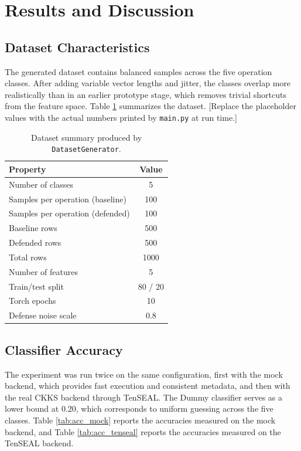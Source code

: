 \documentclass[12pt,a4paper]{article}
\begin{document}
\section{Results and Discussion}

\subsection{Dataset Characteristics}
The generated dataset contains balanced samples across the five operation classes. After adding variable vector lengths and jitter, the classes overlap more realistically than in an earlier prototype stage, which removes trivial shortcuts from the feature space. Table \ref{tab:dataset} summarizes the dataset. [Replace the placeholder values with the actual numbers printed by \texttt{main.py} at run time.]

\begin{table}[h]
\centering
\caption{Dataset summary produced by \texttt{DatasetGenerator}.}
\label{tab:dataset}
\begin{tabular}{lc}
\toprule
\textbf{Property} & \textbf{Value} \\
\midrule
Number of classes                 & 5 \\
Samples per operation (baseline)  & 100 \\
Samples per operation (defended)  & 100 \\
Baseline rows                     & 500 \\
Defended rows                     & 500 \\
Total rows                        & 1000 \\
Number of features                & 5 \\
Train/test split                  & 80 / 20 \\
Torch epochs                      & 10 \\
Defense noise scale               & 0.8 \\
\bottomrule
\end{tabular}
\end{table}

\subsection{Classifier Accuracy}
The experiment was run twice on the same configuration, first with the mock backend, which provides fast execution and consistent metadata, and then with the real CKKS backend through TenSEAL. The Dummy classifier serves as a lower bound at 0.20, which corresponds to uniform guessing across the five classes. Table \ref{tab:acc_mock} reports the accuracies measured on the mock backend, and Table \ref{tab:acc_tenseal} reports the accuracies measured on the TenSEAL backend.
\end{document}
